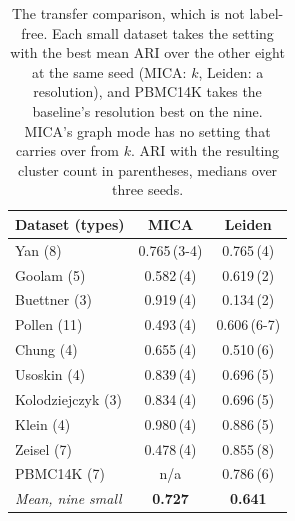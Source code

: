 \begin{table}[t]
\centering
\caption{The transfer comparison, which is not label-free. Each small dataset takes the setting with the best mean ARI over the other eight at the same seed (MICA: $k$, Leiden: a resolution), and PBMC14K takes the baseline's resolution best on the nine. MICA's graph mode has no setting that carries over from $k$. ARI with the resulting cluster count in parentheses, medians over three seeds.}
\label{tab:transfer}
\footnotesize
\setlength{\tabcolsep}{4pt}
\begin{tabular}{lcc}
\toprule
Dataset (types) & MICA & Leiden \\
\midrule
Yan (8) & 0.765\,(3\textrm{-}4) & 0.765\,(4) \\
Goolam (5) & 0.582\,(4) & 0.619\,(2) \\
Buettner (3) & 0.919\,(4) & 0.134\,(2) \\
Pollen (11) & 0.493\,(4) & 0.606\,(6\textrm{-}7) \\
Chung (4) & 0.655\,(4) & 0.510\,(6) \\
Usoskin (4) & 0.839\,(4) & 0.696\,(5) \\
Kolodziejczyk (3) & 0.834\,(4) & 0.696\,(5) \\
Klein (4) & 0.980\,(4) & 0.886\,(5) \\
Zeisel (7) & 0.478\,(4) & 0.855\,(8) \\
PBMC14K (7) & n/a & 0.786\,(6) \\
\midrule
\textit{Mean, nine small} & \textbf{0.727} & \textbf{0.641} \\
\bottomrule
\end{tabular}
\end{table}
